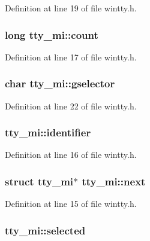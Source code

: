 Definition at line 19 of file wintty.\+h.

\hypertarget{structtty__mi_a9648bba19b3f98fe6d3ea2de7852a479}{
\subsubsection[{count}]{\setlength{\rightskip}{0pt plus 5cm}long tty\+\_\+mi\+::count}}\label{structtty__mi_a9648bba19b3f98fe6d3ea2de7852a479}


Definition at line 17 of file wintty.\+h.

\hypertarget{structtty__mi_a64098b2f798516056e20fd294aca0789}{
\subsubsection[{gselector}]{\setlength{\rightskip}{0pt plus 5cm}char tty\+\_\+mi\+::gselector}}\label{structtty__mi_a64098b2f798516056e20fd294aca0789}


Definition at line 22 of file wintty.\+h.

\hypertarget{structtty__mi_a73099194426e697aef211859b69021d2}{
\subsubsection[{identifier}]{ tty\+\_\+mi\+::identifier}}\label{structtty__mi_a73099194426e697aef211859b69021d2}


Definition at line 16 of file wintty.\+h.

\hypertarget{structtty__mi_ab763b4b48357a342043b32abf63c454b}{
\subsubsection[{next}]{\setlength{\rightskip}{0pt plus 5cm}struct {\bf tty\+\_\+mi}$\ast$ tty\+\_\+mi\+::next}}\label{structtty__mi_ab763b4b48357a342043b32abf63c454b}


Definition at line 15 of file wintty.\+h.

\hypertarget{structtty__mi_ab5378e677355a69672c9ef4145e315a6}{
\subsubsection[{selected}]{ tty\+\_\+mi\+::selected}}\label{structtty__mi_ab5378e677355a69672c9ef4145e315a6}


